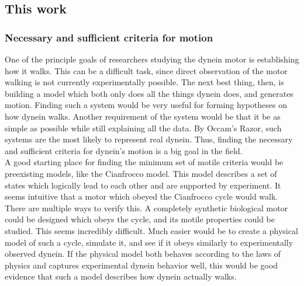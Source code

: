 \documentclass[10pt]{article} %
\begin{document}


\subsection{This work}
\subsubsection{Necessary and sufficient criteria for motion}
One of the principle goals of researchers studying the dynein motor is establishing how it walks. This can be a difficult task, since direct observation of the motor walking is not currently experimentally possible. The next best thing, then, is building a model which both only does all the things dynein does, and generates motion. Finding such a system would be very useful for forming hypotheses on how dynein walks. Another requirement of the system would be that it be as simple as possible while still explaining all the data. By Occam's Razor, such systems are the most likely to represent real dynein. Thus, finding the necessary and sufficient criteria for dynein's motion is a big goal in the field.\\

A good starting place for finding the minimum set of motile criteria would be preexisting models, like the Cianfrocco model. This model describes a set of states which logically lead to each other and are supported by experiment. It seems intuitive that a motor which obeyed the Cianfrocco cycle would walk. There are multiple ways to verify this. A completely synthetic biological motor could be designed which obeys the cycle, and its motile properties could be studied. This seems incredibly difficult. Much easier would be to create a physical model of such a cycle, simulate it, and see if it obeys similarly to experimentally observed dynein. If the physical model both behaves according to the laws of physics and captures experimental dynein behavior well, this would be good evidence that such a model describes how dynein actually walks.\\
\end{document}
